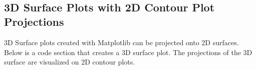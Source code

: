 \documentclass{book}
\begin{document}
    \begin{center}
    \end{center}
    { \hspace*{\fill} \\}
    

    
        \hypertarget{d-surface-plots-with-2d-contour-plot-projections}{%
\subsection{3D Surface Plots with 2D Contour Plot
Projections}\label{d-surface-plots-with-2d-contour-plot-projections}}
    




    
        3D Surface plots created with Matplotlib can be projected onto 2D
surfaces. Below is a code section that creates a 3D surface plot. The
projections of the 3D surface are visualized on 2D contour plots.
    
\end{document}
